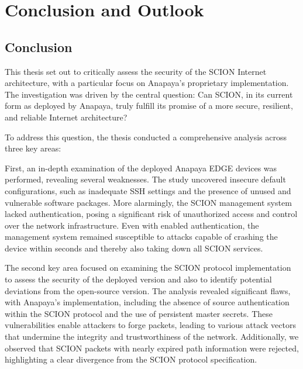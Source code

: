 \chapter{Conclusion and Outlook}
\label{ch:conclusion}



\section{Conclusion}

This thesis set out to critically assess the security of the SCION Internet architecture, with a particular focus on Anapaya's proprietary implementation.
The investigation was driven by the central question:
Can SCION, in its current form as deployed by Anapaya, truly fulfill its promise of a more secure, resilient, and reliable Internet architecture?

To address this question, the thesis conducted a comprehensive analysis across three key areas:

First, an in-depth examination of the deployed Anapaya EDGE devices was performed, revealing several weaknesses.
The study uncovered insecure default configurations, such as inadequate SSH settings and the presence of unused and vulnerable software packages.
More alarmingly, the SCION management system lacked authentication, posing a significant risk of unauthorized access and control over the network infrastructure.
Even with enabled authentication, the management system remained susceptible to attacks capable of crashing the device within seconds and thereby also taking down all SCION services.


The second key area focused on examining the SCION protocol implementation to assess the security of the deployed version and also to identify potential deviations from the open-source version.
The analysis revealed significant flaws, with Anapaya's implementation, including the absence of source authentication within the SCION protocol and the use of persistent master secrets.
These vulnerabilities enable attackers to forge packets, leading to various attack vectors that undermine the integrity and trustworthiness of the network.
Additionally, we observed that SCION packets with nearly expired path information were rejected, highlighting a clear divergence from the SCION protocol specification.

